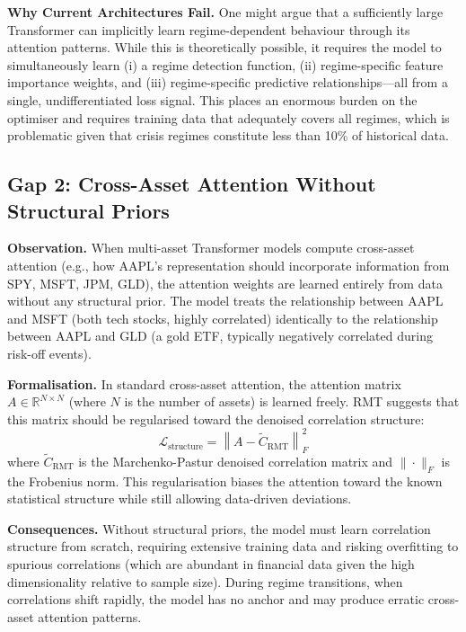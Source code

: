 \documentclass[conference]{IEEEtran}
\begin{document}
\textbf{Why Current Architectures Fail.} One might argue that a sufficiently large Transformer can implicitly learn regime-dependent behaviour through its attention patterns. While this is theoretically possible, it requires the model to simultaneously learn (i) a regime detection function, (ii) regime-specific feature importance weights, and (iii) regime-specific predictive relationships---all from a single, undifferentiated loss signal. This places an enormous burden on the optimiser and requires training data that adequately covers all regimes, which is problematic given that crisis regimes constitute less than 10\% of historical data.

\subsection{Gap 2: Cross-Asset Attention Without Structural Priors}

\textbf{Observation.} When multi-asset Transformer models compute cross-asset attention (e.g., how AAPL's representation should incorporate information from SPY, MSFT, JPM, GLD), the attention weights are learned entirely from data without any structural prior. The model treats the relationship between AAPL and MSFT (both tech stocks, highly correlated) identically to the relationship between AAPL and GLD (a gold ETF, typically negatively correlated during risk-off events).

\textbf{Formalisation.} In standard cross-asset attention, the attention matrix $A \in \mathbb{R}^{N \times N}$ (where $N$ is the number of assets) is learned freely. RMT suggests that this matrix should be regularised toward the denoised correlation structure:
\begin{equation}
\mathcal{L}_{\text{structure}} = \left\| A - \tilde{C}_{\text{RMT}} \right\|_F^2
\end{equation}
where $\tilde{C}_{\text{RMT}}$ is the Marchenko-Pastur denoised correlation matrix and $\| \cdot \|_F$ is the Frobenius norm. This regularisation biases the attention toward the known statistical structure while still allowing data-driven deviations.

\textbf{Consequences.} Without structural priors, the model must learn correlation structure from scratch, requiring extensive training data and risking overfitting to spurious correlations (which are abundant in financial data given the high dimensionality relative to sample size). During regime transitions, when correlations shift rapidly, the model has no anchor and may produce erratic cross-asset attention patterns.
\end{document}
